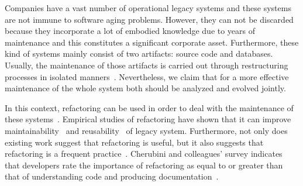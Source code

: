 Companies have a vast number of operational legacy systems and these systems are not immune to software aging problems. However, they can not be discarded because they incorporate a lot of embodied knowledge due to years of maintenance and this constitutes a significant corporate asset. Furthermore, these kind of systems mainly consist of two artifacts: source code and databases. Usually, the maintenance of those artifacts is carried out through restructuring processes in isolated manners~\cite{Griffith2011}. Nevertheless, we claim that for a more effective maintenance of the whole system both should be analyzed and evolved jointly. 

In this context, refactoring can be used in order to deal with the maintenance of these systems~\cite{refactImpro}. %
 Empirical studies of refactoring have shown that it can improve maintainability~\cite{1510132} and reusability~\cite{Moser:2006} of legacy system. Furthermore, not only does existing work suggest that refactoring is useful, but it also suggests that refactoring is a frequent practice~\cite{Murphy:2011}. Cherubini and colleagues' survey indicates that developers rate the importance of refactoring as equal to or greater than that of understanding code and producing documentation~\cite{Cherubini:2007}.

